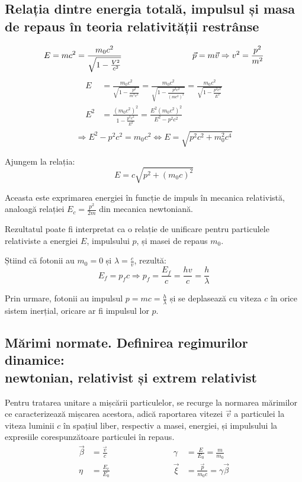\subsection{Relația dintre energia totală, impulsul și masa de repaus în teoria
relativității restrânse}
\[
    E = mc^2 = \frac{m_0c^2}{\lorentzradical}
    \hspace{3cm}
    \vec{p} = m\vec{v} \Rightarrow v^2 = \frac{p^2}{m^2}
\]
\begin{align*}
    E &= \frac{m_0c^2}{\sqrt{1 - \frac{p^2}{m^2c^2}}}
    = \frac{m_0c^2}{\sqrt{1 - \frac{p^2c^2}{(mc^2)^2}}}
    = \frac{m_0c^2}{\sqrt{1 - \frac{p^2c^2}{E^2}}} \\
    E^2 &= \frac{(m_0c^2)^2}{1 - \frac{p^2c^2}{E^2}}
    = \frac{E^2(m_0c^2)^2}{E^2 - p^2c^2} \\
\end{align*}
\[
    \Rightarrow E^2 - p^2c^2 = m_0c^2
    \Leftrightarrow E = \sqrt{p^2c^2 + m_0^2c^4}
\]

Ajungem la relația:
{
    \color{\accentcolor}
    \[ E = c\sqrt{p^2 + (m_0c)^2} \]
}

Aceasta este exprimarea energiei în funcție de impuls în mecanica relativistă,
analoagă relației \( E_c = \frac{p^2}{2m} \) din mecanica newtoniană.

Rezultatul poate fi interpretat ca o relație de unificare pentru particulele
relativiste a energiei $E$, impulsului $p$, și masei de repaus $m_0$.

Știind că fotonii au $m_0 = 0$ și \( \lambda = \frac{c}{v} \), rezultă:
\[ E_f = p_f c \Rightarrow p_f = \frac{E_f}{c} = \frac{hv}{c} = \frac{h}{\lambda} \]

Prin urmare, fotonii au impulsul \( p = mc = \frac{h}{\lambda} \) și se
deplasează cu viteza $c$ în orice sistem inerțial, oricare ar fi impulsul lor
$p$.

\subsection{Mărimi normate. Definirea regimurilor dinamice:\\ newtonian,
relativist și extrem relativist}

Pentru tratarea unitare a mișcării particulelor, se recurge la normarea
mărimilor ce caracterizează mișcarea acestora, adică raportarea vitezei
$\vec{v}$ a particulei la viteza luminii $c$ în spațiul liber, respectiv
a masei, energiei, și impulsului la expresiile corespunzătoare particulei
în repaus.
\[
\begin{aligned}
    \vec{\beta} &= \frac{\vec{v}}{c}
    \hspace{3cm}
    &\gamma    &= \frac{E}{E_0} = \frac{m}{m_0} \\
    \eta        &= \frac{E_c}{E_0}
    &\vec{\xi} &= \frac{\vec{p}}{m_0c} = \gamma\vec{\beta}
\end{aligned}
\]


